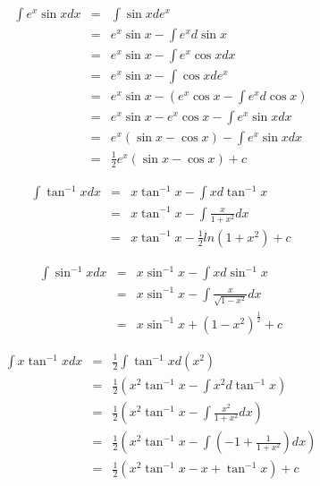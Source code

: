 \begin{eg}
$$\begin{array}{rcl}
\displaystyle \int e^x \sin x dx & = & \displaystyle \int \sin x de^x\\
& = & \displaystyle e^x \sin x - \int e^x d\sin x\\
& = & \displaystyle e^x \sin x - \int e^x \cos x dx\\
& = & \displaystyle e^x \sin x - \int \cos x de^x\\
& = & \displaystyle e^x \sin x - (e^x \cos x - \int e^x d\cos x)\\
& = & \displaystyle e^x \sin x - e^x \cos x - \int e^x \sin x dx\\
& = & \displaystyle e^x (\sin x - \cos x) - \int e^x \sin x dx\\
& = & \displaystyle \frac{1}{2} e^x (\sin x - \cos x) +c
\end{array}$$
\end{eg}
\begin{eg}
$$\begin{array}{rcl}
\displaystyle \int \tan^{-1}x dx & = & \displaystyle x \tan^{-1}x - \int x d\tan^{-1} x\\
& = & \displaystyle x \tan^{-1} x - \int \frac{x}{1+x^2} dx\\
& = & \displaystyle x \tan^{-1} x - \frac{1}{2}ln (1+x^2) +c
\end{array}$$
\end{eg}
\begin{eg}
$$\begin{array}{rcl}
\displaystyle \int \sin^{-1} x dx & = & \displaystyle x \sin^{-1} x - \int x d \sin^{-1} x\\
& = & \displaystyle x \sin^{-1} x - \int \frac{x}{\sqrt{1-x^2}} dx\\
& = & \displaystyle x \sin^{-1} x + (1-x^2)^{\frac{1}{2}} + c
\end{array}$$
\end{eg}
\begin{eg}
$$\begin{array}{rcl}
\displaystyle \int x \tan^{-1} x dx & = & \displaystyle \frac{1}{2} \int \tan^{-1}x d(x^2)\\
& = & \displaystyle \frac{1}{2} (x^2 \tan^{-1} x - \int x^2 d\tan^{-1} x)\\
& = & \displaystyle \frac{1}{2} (x^2 \tan^{-1} x - \int \frac{x^2}{1+x^2} dx)\\
& = & \displaystyle \frac{1}{2} (x^2 \tan^{-1} x - \int (-1 + \frac{1}{1+x^2}) dx)\\
& = & \displaystyle \frac{1}{2} (x^2 \tan^{-1} x - x + \tan^{-1} x) + c
\end{array}$$
\end{eg}
